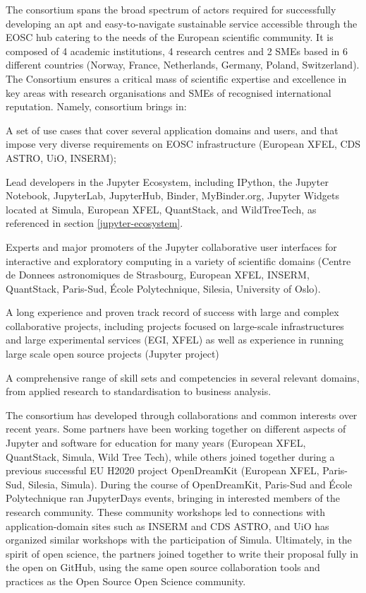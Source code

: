 The \TheProject consortium spans the broad spectrum of actors required
for successfully developing an apt and easy-to-navigate sustainable service
accessible through the EOSC hub catering to the needs of the European
scientific community. It is composed of 4 academic institutions, 4 research
centres and 2 SMEs based in 6 different countries (Norway, France,
Netherlands, Germany, Poland, Switzerland).
The Consortium ensures a critical mass of scientific expertise and excellence
in key areas  with research organisations and SMEs of recognised
 international reputation. Namely, \TheProject consortium brings in:
\begin{compactitem}
\item A set of use cases that cover several application domains and users, and that impose very diverse
requirements on EOSC infrastructure (European XFEL, CDS ASTRO, UiO, INSERM);
\item Lead developers in the Jupyter Ecosystem, including IPython, the Jupyter Notebook, JupyterLab,
JupyterHub, Binder, MyBinder.org, Jupyter Widgets located at Simula, European XFEL, QuantStack, and
WildTreeTech,
as referenced in section \ref{jupyter-ecosystem}.
\item Experts and major promoters of the Jupyter collaborative user interfaces for interactive and exploratory
computing in a variety of scientific domains (Centre de Donnees
astronomiques de Strasbourg, European XFEL,
INSERM, QuantStack, Paris-Sud, \'Ecole Polytechnique, Silesia,
University of Oslo).
\item A long experience and proven track record of success with large and complex collaborative projects,
including projects focused on large-scale infrastructures and large experimental services (EGI, XFEL) as well
as experience in running large scale open source projects (Jupyter project)
\item A comprehensive range of skill sets and competencies in several relevant domains, from applied
research to standardisation to business
analysis.
\end{compactitem}

The consortium has developed through collaborations and common interests over recent years.
Some partners have been working together on different aspects of Jupyter
and software for education for many years (European XFEL, QuantStack, Simula, Wild Tree Tech),
while others joined together during a previous successful EU H2020 project OpenDreamKit (European XFEL,
Paris-Sud, Silesia, Simula).
During the course of OpenDreamKit, Paris-Sud and \'Ecole Polytechnique
ran JupyterDays events, bringing in interested members of the research community.
These community workshops led to connections with application-domain sites such as INSERM and CDS
ASTRO,
and UiO has organized similar workshops with the participation of Simula.
Ultimately, in the spirit of open science,
the partners joined together to write their proposal fully in the open on GitHub,
using the same open source collaboration tools and practices
as the Open Source Open Science community.


